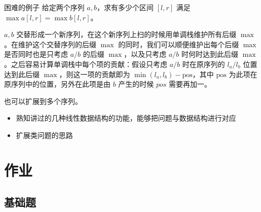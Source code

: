\begin{exercise}{困难的例子}
    给定两个序列 $a,b$，求有多少个区间 $[l,r]$ 满足 $\max a[l,r]=\max b[l,r]$。
\end{exercise}
\begin{solution}
    $a,b$ 交替形成一个新序列，在这个新序列上扫的时候用单调栈维护所有后缀 $\max$。在维护这个交替序列的后缀 $\max$ 的同时，我们可以顺便维护出每个后缀 $\max$ 是否同时也是只考虑 $a/b$ 的后缀 $\max$，以及只考虑 $a/b$ 时何时达到此后缀 $\max$。之后容易计算单调栈中每个项的贡献：假设只考虑 $a/b$ 时在原序列的 $l_a/l_b$ 位置达到此后缀 $\max$，则这一项的贡献即为 $\min(l_a,l_b)-\mathrm{pos}$，其中 $\mathrm{pos}$ 为此项在原序列中的位置，另外在此项是由 $b$ 产生的时候 $pos$ 需要再加一。

    也可以扩展到多个序列。
\end{solution}




\begin{summary}
\begin{itemize}
    \item 熟知讲过的几种线性数据结构的功能，能够把问题与数据结构进行对应
    \item 扩展类问题的思路
\end{itemize}
\end{summary}

\section{作业}

\subsection{基础题}

